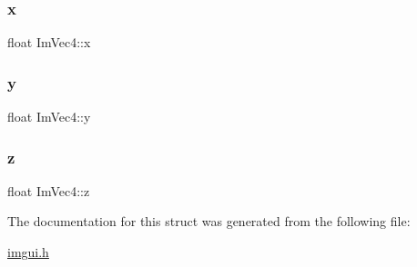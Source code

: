 \mbox{\label{struct_im_vec4_a2090f651f5e5b78fedae8dab87343db6}} 
\subsubsection{\texorpdfstring{x}{x}}
{\footnotesize\ttfamily float Im\+Vec4\+::x}

\mbox{\label{struct_im_vec4_a6b4d00ae261be4fe54353c759c561fe7}} 
\subsubsection{\texorpdfstring{y}{y}}
{\footnotesize\ttfamily float Im\+Vec4\+::y}

\mbox{\label{struct_im_vec4_aba6a75356917a28c967954bb29133a1a}} 
\subsubsection{\texorpdfstring{z}{z}}
{\footnotesize\ttfamily float Im\+Vec4\+::z}



The documentation for this struct was generated from the following file\+:\begin{DoxyCompactItemize}
\item 
\mbox{\hyperlink{imgui_8h}{imgui.\+h}}\end{DoxyCompactItemize}

